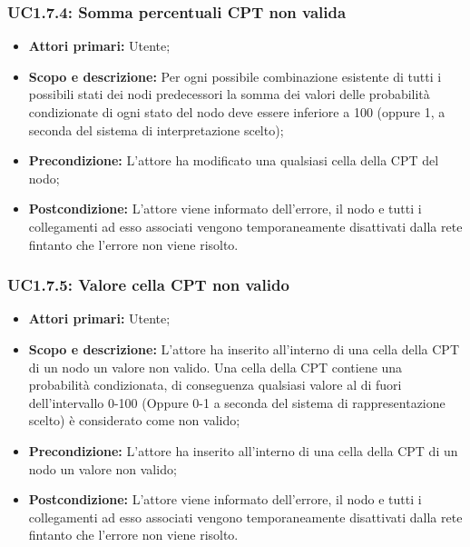 \subsubsection{UC1.7.4: Somma percentuali CPT non valida} 
\begin{itemize} 
	\item{\textbf{Attori primari:} Utente;} 
	\item{\textbf{Scopo e descrizione:} Per ogni possibile combinazione esistente di tutti i possibili stati dei nodi predecessori la somma dei valori delle probabilità condizionate di ogni stato del nodo deve essere inferiore a 100 (oppure 1, a seconda del sistema di interpretazione scelto);} 
	\item{\textbf{Precondizione:} L'attore ha modificato una qualsiasi cella della CPT del nodo;} 
	\item{\textbf{Postcondizione:} L'attore viene informato dell'errore, il nodo e tutti i collegamenti ad esso associati vengono temporaneamente disattivati dalla rete fintanto che l'errore non viene risolto.}
\end{itemize} 
\subsubsection{UC1.7.5: Valore cella CPT non valido} 
\begin{itemize} 
	\item{\textbf{Attori primari:} Utente;} 
	\item{\textbf{Scopo e descrizione:} L'attore ha inserito all'interno di una cella della CPT di un nodo un valore non valido. Una cella della CPT contiene una probabilità condizionata, di conseguenza qualsiasi valore al di fuori dell'intervallo 0-100 (Oppure 0-1 a seconda del sistema di rappresentazione scelto) è considerato come non valido;} 
	\item{\textbf{Precondizione:} L'attore ha inserito all'interno di una cella della CPT di un nodo un valore non valido;} 
	\item{\textbf{Postcondizione:} L'attore viene informato dell'errore, il nodo e tutti i collegamenti ad esso associati vengono temporaneamente disattivati dalla rete fintanto che l'errore non viene risolto.} 
\end{itemize} 
